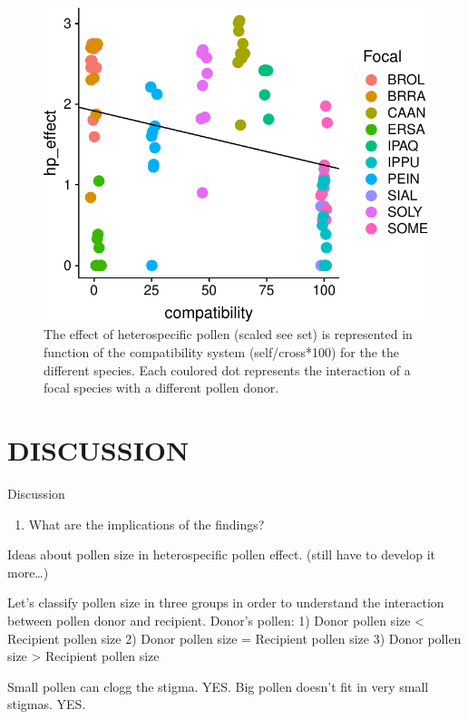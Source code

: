 \documentclass[11pt,a4paper]{article}
\providecommand{\tightlist}{%
  \setlength{\itemsep}{0pt}\setlength{\parskip}{0pt}}
\begin{document}
\begin{figure}
\centering
\includegraphics{output/figures/unnamed-chunk-3-1.pdf}
\caption{The effect of heterospecific pollen (scaled see set) is
represented in function of the compatibility system (self/cross*100) for
the the different species. Each coulored dot represents the interaction
of a focal species with a different pollen donor.}
\end{figure}

\newpage

\section{DISCUSSION}\label{discussion}

Discussion

\begin{enumerate}
\def\labelenumi{\arabic{enumi}.}
\tightlist
\item
  What are the implications of the findings?
\end{enumerate}

Ideas about pollen size in heterospecific pollen effect. (still have to
develop it more\ldots{})

Let's classify pollen size in three groups in order to understand the
interaction between pollen donor and recipient. Donor's pollen: 1) Donor
pollen size \textless{} Recipient pollen size 2) Donor pollen size =
Recipient pollen size 3) Donor pollen size \textgreater{} Recipient
pollen size

Small pollen can clogg the stigma. YES. Big pollen doesn't fit in very
small stigmas. YES.
\end{document}
